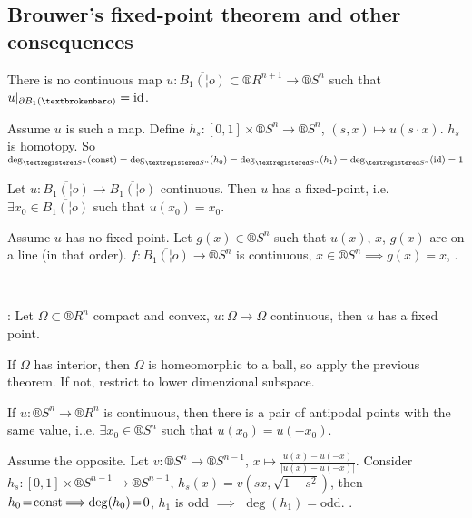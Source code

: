 \documentclass[12pt]{article}					%
\begin{document}

\subsection{Brouwer's fixed-point theorem and other consequences}
\begin{veta}[No interaction]
	There is no continuous map $u: \overline{B_1(¦o)} \subset ®R^{n+1} \rightarrow ®S^n$ such that $u |_{\partial B_1(¦o)} = \id$.

	\begin{dukazin}
		Assume $u$ is such a map. Define $h_s: [0, 1] \times ®S^n \rightarrow ®S^n$, $(s, x) \mapsto u(s·x)$. $h_s$ is homotopy. So $\deg_{®S^n}(\const) = \deg_{®S^n}(h_0) = \deg_{®S^n}(h_1) = \deg_{®S^n}(\id) = 1$
	\end{dukazin}
\end{veta}

\begin{veta}
	Let $u: \overline{B_1(¦o)} \rightarrow \overline{B_1(¦o)}$ continuous. Then $u$ has a fixed-point, i.e. $\exists x_0 \in \overline{B_1(¦o)}$ such that $u(x_0) = x_0$.

	\begin{dukazin}
		Assume $u$ has no fixed-point. Let $g(x) \in ®S^n$ such that $u(x)$, $x$, $g(x)$ are on a line (in that order). $f: \overline{B_1(¦o)} \rightarrow ®S^n$ is continuous, $x \in ®S^n \implies g(x) = x$, \lightning.
	\end{dukazin}
\end{veta}

\begin{dusledek}
	\ \vspace{-3.45em}

	\indent\hspace{2.5em}: Let $Ω \subset ®R^n$ compact and convex, $u\!\!: Ω \rightarrow Ω$ continuous, then $u$ has a fixed point.

	\begin{dukazin}
		If $Ω$ has interior, then $Ω$ is homeomorphic to a ball, so apply the previous theorem. If not, restrict to lower dimenzional subspace.
	\end{dukazin}
\end{dusledek}

\begin{veta}
	If $u: ®S^n \rightarrow ®R^n$ is continuous, then there is a pair of antipodal points with the same value, i..e. $\exists x_0 \in ®S^n$ such that $u(x_0) = u(-x_0)$.

	\begin{dukazin}
		Assume the opposite. Let $v\!\!: ®S^n \!\rightarrow ®S^{n-1}$, $x \mapsto \frac{u(x) - u(-x)}{|u(x) - u(-x)|}$. Consider $h_s\!\!: [0, 1] \times ®S^{n - 1} \!\rightarrow ®S^{n-1}$, $h_s(x) \!=\! v(sx, \sqrt{1 - s^2})$, then $h_0 \!=\! \const \!\!\implies\!\! \deg(h_0) \!=\! 0$, $h_1$ is odd $\!\!\implies\!\!$ $\deg(h_1) \!=\! \text{odd}$. \lightning.
	\end{dukazin}
\end{veta}
\end{document}
